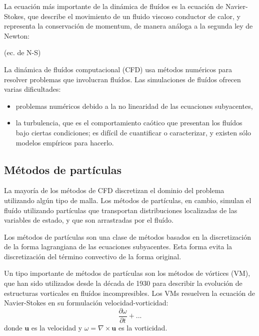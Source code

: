 \documentclass[11pt,spanish]{article}
\begin{document}
La ecuación más importante de la dinámica de fluídos es la ecuación de
Navier-Stokes, que describe el movimiento de un fluido viscoso conductor de
calor, y representa la conservación de momentum, de manera análoga a la segunda
ley de Newton:

  (ec. de N-S)


La dinámica de fluídos computacional (CFD) usa métodos numéricos para resolver
problemas que involucran fluídos.  Las simulaciones de fluídos ofrecen varias
dificultades:

\begin{itemize}
  \item problemas numéricos debido a la no linearidad de las ecuaciones subyacentes,
  \item la turbulencia, que es el comportamiento caótico que presentan los fluídos
    bajo ciertas condiciones;  es difícil de cuantificar o
    caracterizar, y existen sólo modelos empíricos para hacerlo.
\end{itemize}



\subsection{Métodos de partículas}
La mayoría de los métodos de CFD discretizan el dominio del problema utilizando
algún tipo de malla.  Los métodos de partículas, en cambio, simulan el fluído
utilizando partículas que transportan distribuciones localizadas de las
variables de estado, y que son arrastradas por el fluído.

Los métodos de partículas son una clase de métodos basados en la discretización
de la forma lagrangiana de las ecuaciones subyacentes.  Esta forma evita la
discretización del término convectivo de la forma original.

Un tipo importante de métodos de partículas son los métodos de vórtices (VM),
que han sido utilizados desde la década de 1930 para describir la evolución de
estructuras vorticales en fluídos incompresibles.
\cite{multiscale}
Los VMs resuelven la ecuación de Navier-Stokes en su formulación
velocidad-vorticidad:
\begin{equation}
    \frac{\partial {\omega}}{\partial t} + ...
\end{equation}
donde $\mathbf{u}$ es la velocidad
y $\omega = \nabla\times\mathbf{u}$ es la vorticidad.
\end{document}
